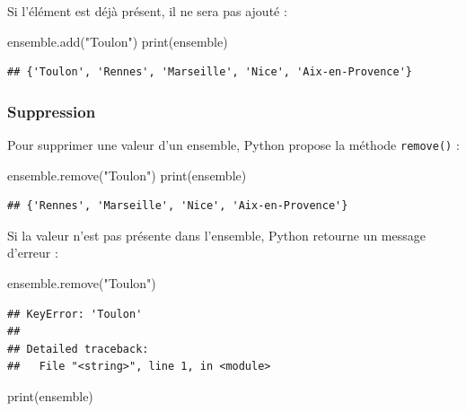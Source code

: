 \documentclass[12pt,]{book}
\newenvironment{Shaded}{\begin{snugshade}}{\end{snugshade}}
\newcommand{\StringTok}[1]{\textcolor[rgb]{0.31,0.60,0.02}{#1}}
\newcommand{\BuiltInTok}[1]{#1}
\newcommand{\NormalTok}[1]{#1}
\numberwithin{equation}{section}
\numberwithin{countremarque}{section}
\begin{document}
Si l'élément est déjà présent, il ne sera pas ajouté :

\begin{Shaded}
\begin{Highlighting}[]
\NormalTok{ensemble.add(}\StringTok{"Toulon"}\NormalTok{)}
\BuiltInTok{print}\NormalTok{(ensemble)}
\end{Highlighting}
\end{Shaded}

\begin{lstlisting}
## {'Toulon', 'Rennes', 'Marseille', 'Nice', 'Aix-en-Provence'}
\end{lstlisting}

\subsubsection{Suppression}\label{suppression}

Pour supprimer une valeur d'un ensemble, Python propose la méthode
\texttt{remove()} :

\begin{Shaded}
\begin{Highlighting}[]
\NormalTok{ensemble.remove(}\StringTok{"Toulon"}\NormalTok{)}
\BuiltInTok{print}\NormalTok{(ensemble)}
\end{Highlighting}
\end{Shaded}

\begin{lstlisting}
## {'Rennes', 'Marseille', 'Nice', 'Aix-en-Provence'}
\end{lstlisting}

Si la valeur n'est pas présente dans l'ensemble, Python retourne un
message d'erreur :

\begin{Shaded}
\begin{Highlighting}[]
\NormalTok{ensemble.remove(}\StringTok{"Toulon"}\NormalTok{)}
\end{Highlighting}
\end{Shaded}

\begin{lstlisting}
## KeyError: 'Toulon'
## 
## Detailed traceback: 
##   File "<string>", line 1, in <module>
\end{lstlisting}

\begin{Shaded}
\begin{Highlighting}[]
\BuiltInTok{print}\NormalTok{(ensemble)}
\end{Highlighting}
\end{Shaded}
\end{document}
